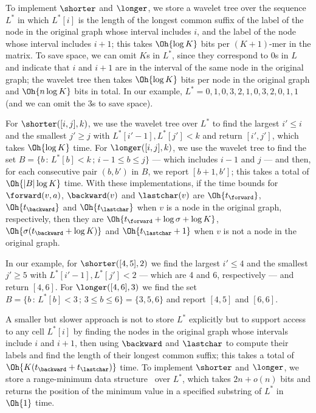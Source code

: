 To implement $\shorter$ and $\longer$, we store a wavelet tree over the sequence $L^*$ in which \(L^* [i]\) is the length of the longest common suffix of the label of the node in the original graph whose interval includes $i$, and the label of the node whose interval includes \(i + 1\); this takes $\Oh{\log K}$ bits per \((K + 1)\)-mer in the matrix.  To save space, we can omit $K$s in $L^*$, since they correspond to 0s in $L$ and indicate that $i$ and \(i + 1\) are in the interval of the same node in the original graph; the wavelet tree then takes $\Oh{\log K}$ bits per node in the original graph and $\Oh{n \log K}$ bits in total.  In our example, \(L^* = 0, 1, 0, 3, 2, 1, 0, 3, 2, 0, 1, 1\) (and we can omit the 3s to save space).

For \(\shorter([i, j], k)\), we use the wavelet tree over $L^*$ to find the largest \(i' \leq i\) and the smallest \(j' \geq j\) with \(L^* [i' - 1], L^* [j'] < k\) and return \([i', j']\), which takes $\Oh{\log K}$ time.  For \(\longer([i, j], k)\), we use the wavelet tree to find the set \(B = \{b\,:\,L^* [b] < k\,;\,i - 1 \leq b \leq j\}\) --- which includes \(i - 1\) and $j$ --- and then, for each consecutive pair \((b, b')\) in $B$, we report \([b + 1, b']\); this takes a total of $\Oh{|B| \log K}$ time.  With these implementations, if the time bounds for \(\forward(v, a)\), \(\backward(v)\) and \(\lastchar(v)\) are $\Oh{t_\forward}$, $\Oh{t_\backward}$ and $\Oh{t_\lastchar}$ when $v$ is a node in the original graph, respectively, then they are $\Oh{t_\forward + \log \sigma + \log K}$, $\Oh{\sigma (t_\backward + \log K)}$ and $\Oh{t_\lastchar + 1}$ when $v$ is not a node in the original graph.

In our example, for \(\shorter([4, 5], 2)\) we find the largest \(i' \leq 4\) and the smallest \(j' \geq 5\) with \(L^* [i' - 1], L^* [j'] < 2\) --- which are 4 and 6, respectively --- and return \([4, 6]\).  For \(\longer([4, 6], 3)\) we find the set \(B = \{b\,:\,L^* [b] < 3\,;\,3 \leq b \leq 6\} = \{3, 5, 6\}\) and report \([4, 5]\) and \([6, 6]\).

A smaller but slower approach is not to store $L^*$ explicitly but to support access to any cell \(L^* [i]\) by finding the nodes in the original graph whose intervals include $i$ and \(i + 1\), then using $\backward$ and $\lastchar$ to compute their labels and find the length of their longest common suffix; this takes a total of $\Oh{K (t_\backward + t_\lastchar)}$ time.  To implement $\shorter$ and $\longer$, we store a range-minimum data structure~\cite{fh2011} over $L^*$, which takes \(2 n + o (n)\) bits and returns the position of the minimum value in a specified substring of $L^*$ in $\Oh{1}$ time.

